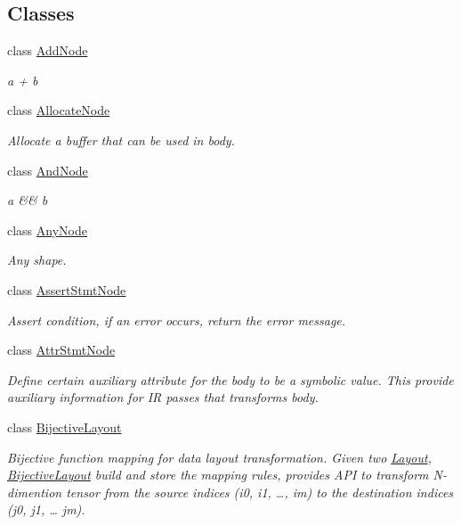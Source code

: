 \subsection*{Classes}
\begin{DoxyCompactItemize}
\item 
class \hyperlink{classtvm_1_1tir_1_1AddNode}{Add\+Node}
\begin{DoxyCompactList}\small\item\em a + b \end{DoxyCompactList}\item 
class \hyperlink{classtvm_1_1tir_1_1AllocateNode}{Allocate\+Node}
\begin{DoxyCompactList}\small\item\em Allocate a buffer that can be used in body. \end{DoxyCompactList}\item 
class \hyperlink{classtvm_1_1tir_1_1AndNode}{And\+Node}
\begin{DoxyCompactList}\small\item\em a \&\& b \end{DoxyCompactList}\item 
class \hyperlink{classtvm_1_1tir_1_1AnyNode}{Any\+Node}
\begin{DoxyCompactList}\small\item\em Any shape. \end{DoxyCompactList}\item 
class \hyperlink{classtvm_1_1tir_1_1AssertStmtNode}{Assert\+Stmt\+Node}
\begin{DoxyCompactList}\small\item\em Assert condition, if an error occurs, return the error message. \end{DoxyCompactList}\item 
class \hyperlink{classtvm_1_1tir_1_1AttrStmtNode}{Attr\+Stmt\+Node}
\begin{DoxyCompactList}\small\item\em Define certain auxiliary attribute for the body to be a symbolic value. This provide auxiliary information for IR passes that transforms body. \end{DoxyCompactList}\item 
class \hyperlink{classtvm_1_1tir_1_1BijectiveLayout}{Bijective\+Layout}
\begin{DoxyCompactList}\small\item\em Bijective function mapping for data layout transformation. Given two \hyperlink{classtvm_1_1tir_1_1Layout}{Layout}, \hyperlink{classtvm_1_1tir_1_1BijectiveLayout}{Bijective\+Layout} build and store the mapping rules, provides A\+PI to transform N-\/dimention tensor from the source indices (i0, i1, …, im) to the destination indices (j0, j1, … jm). \end{DoxyCompactList}\item 

\end{DoxyCompactItemize}
